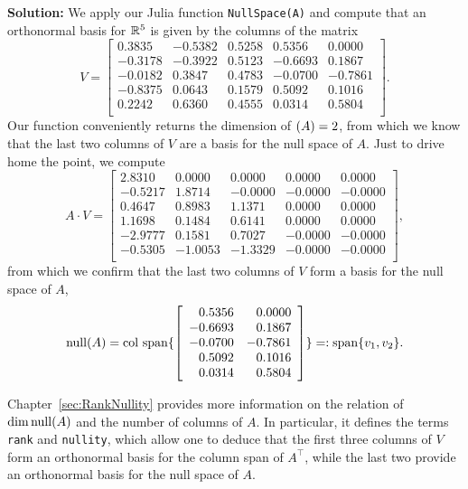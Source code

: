 \textbf{Solution:} We apply our Julia function \texttt{NullSpace(A)} and compute that an orthonormal basis for $\mathbb R^5$ is given by the columns of the matrix
$$V=\left[
\begin{array}{rrrrr}
0.3835 & -0.5382 & 0.5258 & 0.5356 & 0.0000 \\
-0.3178 & -0.3922 & 0.5123 & -0.6693 & 0.1867 \\
-0.0182 & 0.3847 & 0.4783 & -0.0700 & -0.7861 \\
-0.8375 & 0.0643 & 0.1579 & 0.5092 & 0.1016 \\
0.2242 & 0.6360 & 0.4555 & 0.0314 & 0.5804 \\
\end{array}
\right]. $$
Our function conveniently returns the dimension of $\null(A)=2$, from which we know that the last two columns of $V$ are a basis for the null space of $A$. Just to drive home the point, we compute
$$
A \cdot V =\left[
\begin{array}{rrrrr}
2.8310 & 0.0000 & 0.0000 & 0.0000 & 0.0000 \\
-0.5217 & 1.8714 & -0.0000 & -0.0000 & -0.0000 \\
0.4647 & 0.8983 & 1.1371 & 0.0000 & 0.0000 \\
1.1698 & 0.1484 & 0.6141 & 0.0000 & 0.0000 \\
-2.9777 & 0.1581 & 0.7027 & -0.0000 & -0.0000 \\
-0.5305 & -1.0053 & -1.3329 & -0.0000 & -0.0000 \\
\end{array}
\right],
$$
from which we confirm that the last two columns of $V$ form a basis for the null space of $A$,
$$\mathrm{null}(A)=\mathrm{col~span} \{  \left[
\begin{array}{rr}
0.5356 & 0.0000 \\
-0.6693 & 0.1867 \\
-0.0700 & -0.7861 \\
0.5092 & 0.1016 \\
0.0314 & 0.5804 \\
\end{array}
\right]  \}=:\mathrm{span} \{ v_1, v_2 \}. $$

Chapter~\ref{sec:RankNullity} provides more information on the relation of $\dim \mathrm{null}(A)$ and the number of columns of $A$. In particular, it defines the terms \texttt{rank} and \texttt{nullity}, which allow one to deduce that the first three columns of $V$ form an orthonormal basis for the column span of $A^\top$, while the last two provide an orthonormal basis for the null space of $A$. 
\Qed

